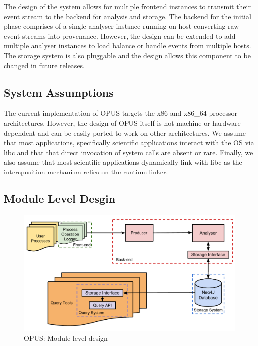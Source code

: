 \documentclass[withindex,glossary]{cam-thesis}
\begin{document}
The design of the system allows for multiple frontend instances to transmit their event stream to the backend for analysis and storage.
The backend for the initial phase comprises of a single analyser instance running on-host converting raw event streams into provenance.
However, the design can be extended to add multiple analyser instances to load balance or handle events from multiple hosts.
The storage system is also pluggable and the design allows this component to be changed in future releases.

\subsection{System Assumptions}
The current implementation of OPUS targets the x86 and x86\_64 processor architectures.
However, the design of OPUS itself is not machine or hardware dependent and can be easily ported to work on other architectures.
We assume that most applications, specifically scientific applications interact with the OS via libc and that that direct invocation of system calls are absent or rare.
Finally, we also assume that most scientific applications dynamically link with libc as the intersposition mechanism relies on the runtime linker.

\subsection{Module Level Desgin}

\begin{figure}[t!]
  \centering
    \includegraphics[width=1.0\columnwidth]{ProvDesign}
  \caption{OPUS: Module level design}
  \label{fig:opuslld}
\end{figure}
\end{document}

